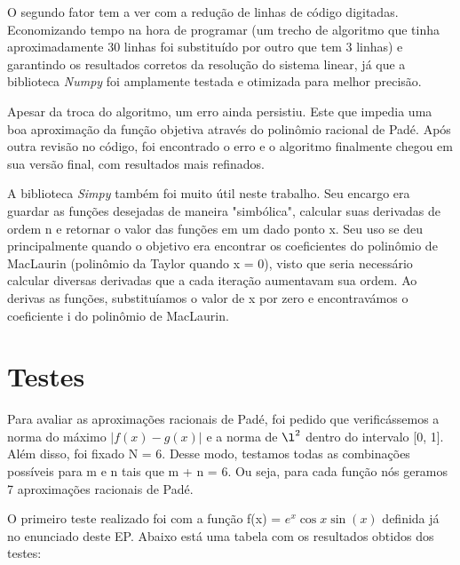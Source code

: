 \documentclass{article}
\begin{document}
    O segundo fator tem a ver com a redução de linhas de código digitadas. Economizando tempo
    na hora de programar (um trecho de algoritmo que tinha aproximadamente 30 linhas foi 
    substituído por outro que tem 3 linhas) e garantindo os resultados corretos da resolução
    do sistema linear, já que a biblioteca \textit{Numpy} foi amplamente testada e otimizada para melhor precisão.

    Apesar da troca do algoritmo, um erro ainda persistiu. Este que impedia uma boa aproximação da
    função objetiva através do polinômio racional de Padé. Após outra revisão no código, foi encontrado o erro e o algoritmo finalmente chegou em sua versão final, com resultados
    mais refinados.

    A biblioteca \textit{Simpy} também foi muito útil neste trabalho.
    Seu encargo era guardar as funções desejadas de maneira "simbólica", calcular suas
    derivadas de ordem n e retornar o valor das funções em um dado ponto x.
    Seu uso se deu principalmente quando o objetivo era encontrar os coeficientes do polinômio
    de MacLaurin (polinômio da Taylor quando x = 0), visto que seria necessário calcular
    diversas derivadas que a cada iteração aumentavam sua ordem.
    Ao derivas as funções, substituíamos o valor de x por zero e encontravámos o coeficiente i do polinômio de MacLaurin.


\section{Testes}
    Para avaliar as aproximações racionais de Padé, foi pedido que verificássemos a norma do máximo $\left | f(x) - g(x) \right |$
    e a norma de $\l^{2}$ dentro do intervalo [0, 1]. Além disso, foi fixado N = 6. Desse modo,
    testamos todas as combinações possíveis para m e n tais que m + n = 6.
    Ou seja, para cada função nós geramos 7 aproximações racionais de Padé.

    
    O primeiro teste realizado foi com a função f(x) = $e^{x}\cos{x}\sin(x)$ definida já no enunciado deste EP.
    Abaixo está uma tabela com os resultados obtidos dos testes:
    
\end{document}
